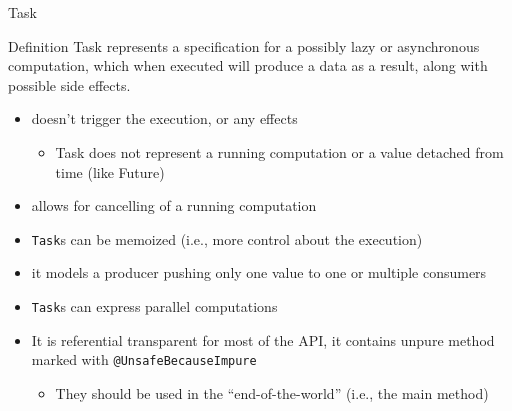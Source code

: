 \documentclass[presentation, 9pt]{beamer}\mode<presentation>{\usetheme{AMSBolognaFC}}
\begin{document}
\begin{frame}{Task \href{https://monix.io/docs/current/eval/task.html}{\faLink}}
	\begin{alertblock}{Definition}
		Task represents a specification for a possibly lazy or asynchronous
computation, which when executed will produce a data as a result, along
with possible side effects.
	\end{alertblock}
	\begin{itemize}
  	\item doesn’t trigger the execution, or any effects 
		\begin{itemize}
			\item  Task does not represent a running computation or a value detached from time (like Future)
		\end{itemize}
   	\item allows for cancelling of a running computation
    \item \texttt{Task}s can be memoized (i.e., more control about the execution)
    \item it models a producer pushing only one value to one or multiple consumers
    \item \texttt{Task}s can express parallel computations
    \item It is referential transparent for most of the API, it contains unpure method marked with \texttt{@UnsafeBecauseImpure}
    \begin{itemize}
			\item They should be used in the ``end-of-the-world'' (i.e., the main method)
		\end{itemize}
	\end{itemize}
\end{frame}
\end{document}
